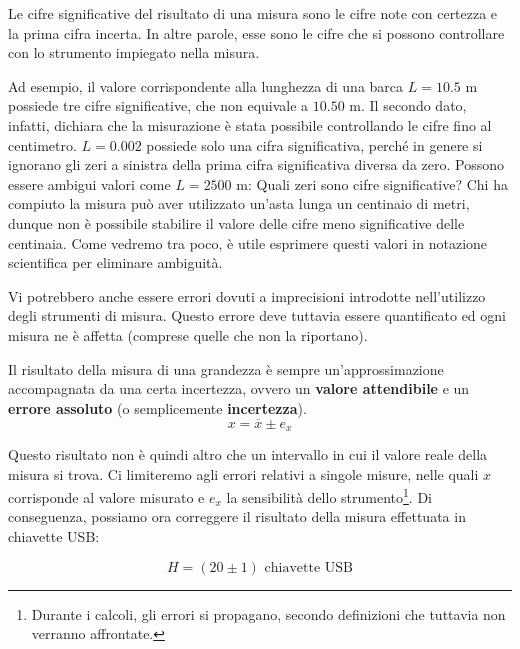 \begin{tcolorbox}[colback = yellow!30, colframe = yellow!30!black, title = {Cifre significative del risultato di una misura}]
Le cifre significative del risultato di una misura sono le cifre note
con certezza e la prima cifra incerta. In altre parole, esse sono le cifre che si
possono controllare con lo strumento impiegato nella misura.
\end{tcolorbox}

\noindent Ad esempio, il valore corrispondente alla lunghezza di una barca $L = 10.5$ m
possiede tre cifre significative, che non equivale a $10.50$ m. Il secondo dato,
infatti, dichiara che la misurazione è stata possibile controllando le cifre
fino al centimetro. $L = 0.002$ possiede solo una cifra significativa, perché
in genere si ignorano gli zeri a sinistra della prima cifra significativa diversa
da zero. Possono essere ambigui valori come $L = 2500 \text{ m}$: Quali zeri sono
cifre significative? Chi ha compiuto la misura può aver utilizzato un'asta lunga
un centinaio di metri, dunque non è possibile stabilire il valore delle cifre
meno significative delle centinaia. Come vedremo tra poco, è utile esprimere questi valori in
notazione scientifica per eliminare ambiguità.

Vi potrebbero anche essere errori dovuti a imprecisioni introdotte nell'utilizzo
degli strumenti di misura. Questo errore deve tuttavia essere quantificato ed ogni
misura ne è affetta (comprese quelle che non la riportano).

\begin{tcolorbox}[colback = yellow!30, colframe = yellow!30!black, title = {Risultato della misura di una grandezza}]
Il risultato della misura di una grandezza è sempre un'approssimazione
accompagnata da una certa incertezza, ovvero un \textbf{valore attendibile}
e un \textbf{errore assoluto} (o semplicemente \textbf{incertezza}).
\[ x = \overline{x} \pm e_x  \]
\end{tcolorbox}

Questo risultato non è quindi altro che un intervallo in cui il valore reale
della misura si trova. Ci limiteremo agli errori relativi a singole misure,
nelle quali $x$ corrisponde al valore misurato e $e_x$ la sensibilità dello
strumento\footnote{Durante i calcoli, gli errori si propagano,
secondo definizioni che tuttavia non verranno affrontate.}. Di conseguenza, possiamo ora correggere il risultato della misura
effettuata in chiavette USB:

\[ H = (20 \pm 1) \text{ chiavette USB} \]

